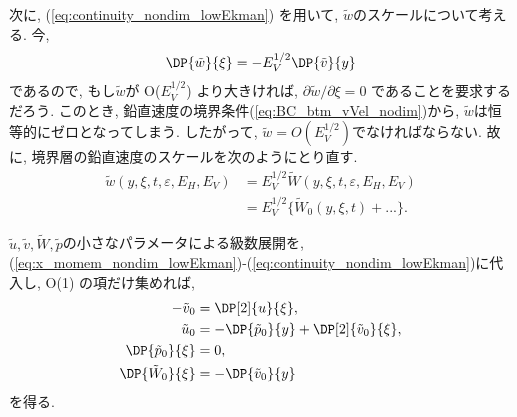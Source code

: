 次に, (\ref{eq:continuity_nondim_lowEkman}) を用いて, $\tilde{w}$のスケールについて考える. 
今, 
\begin{equation}
  \DP{\tilde{w}}{\xi} = - E_V^{1/2} \DP{\tilde{v}}{y}
\end{equation}
であるので, もし$\tilde{w}$が O($E_V^{1/2}$) より大きければ, 
$\partial \tilde{w}/ \partial \xi = 0$
であることを要求するだろう. 
このとき, 鉛直速度の境界条件(\ref{eq:BC_btm_vVel_nodim})から, $\tilde{w}$は恒等的にゼロとなってしまう. 
したがって, $\tilde{w} = O(E_V^{1/2})$でなければならない. 
故に, 境界層の鉛直速度のスケールを次のようにとり直す. 
\begin{equation}
\begin{split}
   \tilde{w}(y,\xi, t, \varepsilon, E_H, E_V) 
  &=   E_V^{1/2} \tilde{W}(y,\xi, t, \varepsilon, E_H, E_V)  \\
  &=   E_V^{1/2} \{ \tilde{W}_0 (y,\xi,t) + ... \}.
\end{split}
\end{equation}

$\tilde{u},\tilde{v},\tilde{W},\tilde{p}$の小さなパラメータによる級数展開を, 
(\ref{eq:x_momem_nondim_lowEkman})-(\ref{eq:continuity_nondim_lowEkman})に代入し, 
O(1) の項だけ集めれば, 
\begin{subequations}
\begin{align}
   - \tilde{v}_0 &= \DP[2]{u}{\xi}, 
       \label{eq:x_momem_nondim_lowEkman_order1} \\
   \tilde{u}_0    &= - \DP{\tilde{p}_0}{y} + \DP[2]{\tilde{v}_0}{\xi}, 
       \label{eq:y_momem_nondim_lowEkman_order1} \\
  \DP{\tilde{p}_0}{\xi} &= 0, 
        \label{eq:hydrostatic_nondim_lowEkman_order1} \\
  \DP{\tilde{W}_0}{\xi} &= - \DP{\tilde{v}_0}{y} 
        \label{eq:continuity_nondim_lowEkman_order1}
\end{align}
\end{subequations}
を得る. 

